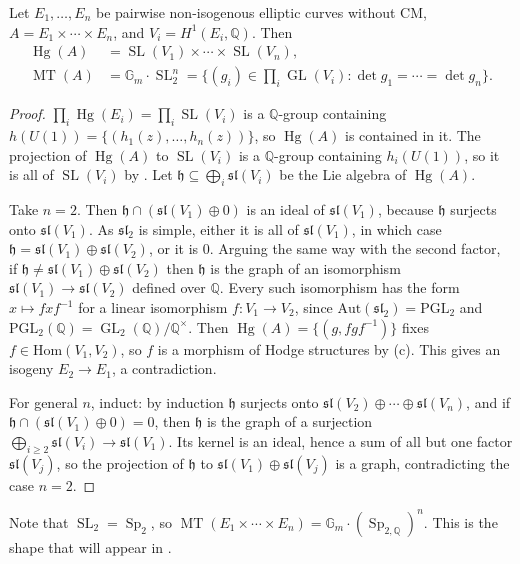 \documentclass[12pt]{amsart}
\newcommand{\Q}{\mathbb{Q}}
\newcommand{\Gm}{\mathbb{G}_m}
\newcommand{\Aut}{\text{Aut}}
\newcommand{\Hom}{\text{Hom}}
\DeclareMathOperator{\GL}{GL}
\DeclareMathOperator{\SL}{SL}
\DeclareMathOperator{\Sp}{Sp}
\DeclareMathOperator{\MT}{MT}
\DeclareMathOperator{\Hg}{Hg}
\newcommand{\fh}{\mathfrak{h}}
\newcommand{\fsl}{\mathfrak{sl}}
\theoremstyle{definition}
\theoremstyle{remark}
\numberwithin{equation}{section}
\begin{document}
\begin{proposition}\label{prop:product-elliptic}
    Let $E_1, \ldots, E_n$ be pairwise non-isogenous elliptic curves without
    CM, $A = E_1 \times \cdots \times E_n$, and $V_i = H^1(E_i, \Q)$. Then
    \begin{align*}
        \Hg(A) &= \SL(V_1) \times \cdots \times \SL(V_n),\\
        \MT(A) &= \Gm \cdot \SL_2^n = \Big\{(g_i) \in \prod_i \GL(V_i) :
        \det g_1 = \cdots = \det g_n\Big\}.
    \end{align*}
\end{proposition}
\begin{proof}
    $\prod_i \Hg(E_i) = \prod_i \SL(V_i)$ is a $\Q$-group containing
    $h(U(1)) = \{(h_1(z), \ldots, h_n(z))\}$, so $\Hg(A)$ is contained in it.
    The projection of $\Hg(A)$ to $\SL(V_i)$ is a $\Q$-group containing
    $h_i(U(1))$, so it is all of $\SL(V_i)$ by . Let
    $\fh \subseteq \bigoplus_i \fsl(V_i)$ be the Lie algebra of $\Hg(A)$.

    Take $n = 2$. Then $\fh \cap (\fsl(V_1) \oplus 0)$ is an ideal of
    $\fsl(V_1)$, because $\fh$ surjects onto $\fsl(V_1)$. As $\fsl_2$ is
    simple, either it is all of $\fsl(V_1)$, in which case
    $\fh = \fsl(V_1) \oplus \fsl(V_2)$, or it is $0$. Arguing the same way
    with the second factor, if $\fh \neq \fsl(V_1) \oplus \fsl(V_2)$ then
    $\fh$ is the graph of an isomorphism $\fsl(V_1) \to \fsl(V_2)$ defined
    over $\Q$. Every such isomorphism has the form $x \mapsto f x f^{-1}$ for
    a linear isomorphism $f \colon V_1 \to V_2$, since
    $\Aut(\fsl_2) = \mathrm{PGL}_2$ and
    $\mathrm{PGL}_2(\Q) = \GL_2(\Q)/\Q^\times$. Then
    $\Hg(A) = \{(g, f g f^{-1})\}$ fixes $f \in \Hom(V_1, V_2)$, so $f$ is a
    morphism of Hodge structures by (c). This gives an
    isogeny $E_2 \to E_1$, a contradiction.

    For general $n$, induct: by induction $\fh$ surjects onto
    $\fsl(V_2) \oplus \cdots \oplus \fsl(V_n)$, and if
    $\fh \cap (\fsl(V_1) \oplus 0) = 0$, then $\fh$ is the graph of a surjection
    $\bigoplus_{i \geq 2} \fsl(V_i) \to \fsl(V_1)$. Its kernel is an ideal,
    hence a sum of all but one factor $\fsl(V_j)$, so the projection of $\fh$
    to $\fsl(V_1) \oplus \fsl(V_j)$ is a graph, contradicting the case
    $n = 2$.
\end{proof}

Note that $\SL_2 = \Sp_2$, so $\MT(E_1 \times \cdots \times E_n) =
\Gm \cdot (\Sp_{2,\Q})^n$. This is the shape that will appear in
.
\end{document}
